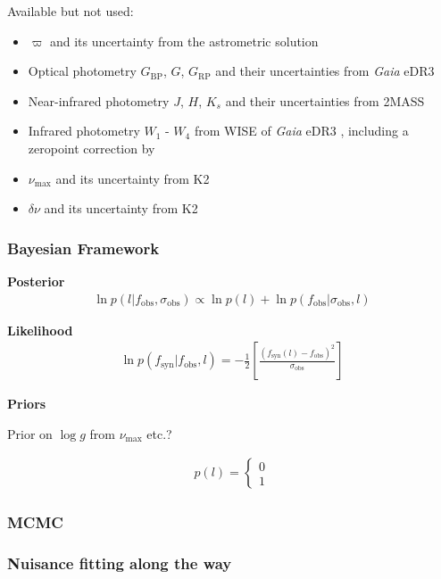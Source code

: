 \documentclass[
  journal=pasa,
  manuscript=research-paper, %
  year=2021,
  volume=37,
]{cup-journal}
\newcommand{\logg}{$\log g$\xspace}
\newcommand{\numax}{$\nu_\mathrm{max}$\xspace}
\newcommand{\Gaia}{\textit{Gaia}\xspace}
\begin{document}
Available but not used:
\begin{itemize}
    \item $\varpi$ and its uncertainty from the astrometric solution
    \item Optical photometry $G_\text{BP}$, $G$, $G_\text{RP}$ and their uncertainties from \Gaia eDR3 \citep{Brown2021}
    \item Near-infrared photometry $J$, $H$, $K_s$ and their uncertainties from 2MASS \citep{Skrutskie2006}
    \item Infrared photometry $W_1$ - $W_4$ from WISE \citep{Cutri2013}
    \citep{Lindegren2021a} of \Gaia eDR3 \citep{Brown2021}, including a zeropoint correction by \citet{Lindegren2021b}
    \item \numax and its uncertainty from K2 \citep[][in prep.]{Zinn2020}
    \item $\delta \nu$ and its uncertainty from K2 \citep[][in prep.]{Zinn2020}
\end{itemize}

\subsubsection{Bayesian Framework}

\textbf{Posterior}
\begin{align}
    \ln p (l \vert f_\text{obs}, \sigma_\text{obs})
    \propto
    \ln p (l) + \ln p (f_\text{obs} \vert \sigma_\text{obs}, l)
\end{align}

\textbf{Likelihood}
\begin{align}
    \ln p \left( f_\text{syn} \vert f_\text{obs}, l \right) = - \frac{1}{2} \left[ \frac{\left(f_\text{syn}(l) - f_\text{obs} \right)^2}{\sigma_\text{obs}} \right]
\end{align}

\textbf{Priors}

Prior on \logg from \numax etc.?

\begin{align}
    p (l) = \begin{cases} 0 \\ 1 \end{cases}
\end{align}

\subsubsection{MCMC}

\subsubsection{Nuisance fitting along the way}
\end{document}
